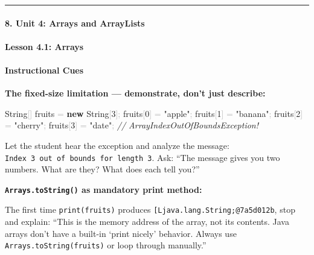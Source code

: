 \documentclass[
  justified,
  openright,
]{tufte-book}
\let\subsection\paragraph
\let\paragraph\paragraph
\newcommand{\KeywordTok}[1]{\textcolor{CodeKeyword}{\textbf{#1}}}  %
\newcommand{\StringTok}[1]{\textcolor{CodeString}{#1}}              %
\newcommand{\CommentTok}[1]{\textcolor{CodeComment}{\textit{#1}}}  %
\newcommand{\CodeNumTok}[1]{\textcolor{CodeNumber}{#1}}             %
\newcommand{\OperatorTok}[1]{\textcolor{DarkGray}{#1}}              %
\newenvironment{Shaded}{%
  \begin{mdframed}[style=TufteCode]%
}{%
  \end{mdframed}%
}
\let\subsection\paragraph
\let\paragraph\paragraph
\begin{document}
\begin{center}\rule{0.5\linewidth}{0.5pt}\end{center}

\subsection{8. Unit 4: Arrays and
ArrayLists}\label{unit-4-arrays-and-arraylists}

\subsection{Lesson 4.1: Arrays}\label{lesson-4.1-arrays-1}

\paragraph{Instructional Cues}\label{instructional-cues-26}

\textbf{The fixed-size limitation --- demonstrate, don't just describe:}

\begin{Shaded}
\begin{Highlighting}[]
String\OperatorTok{[]} fruits \OperatorTok{=} \KeywordTok{new} String\OperatorTok{[}\CodeNumTok{3}\OperatorTok{];}
fruits\OperatorTok{[}\CodeNumTok{0}\OperatorTok{]} \OperatorTok{=} \StringTok{"apple"}\OperatorTok{;}
fruits\OperatorTok{[}\CodeNumTok{1}\OperatorTok{]} \OperatorTok{=} \StringTok{"banana"}\OperatorTok{;}
fruits\OperatorTok{[}\CodeNumTok{2}\OperatorTok{]} \OperatorTok{=} \StringTok{"cherry"}\OperatorTok{;}
fruits\OperatorTok{[}\CodeNumTok{3}\OperatorTok{]} \OperatorTok{=} \StringTok{"date"}\OperatorTok{;}   \CommentTok{// ArrayIndexOutOfBoundsException!}
\end{Highlighting}
\end{Shaded}

Let the student hear the exception and analyze the message:
\texttt{Index\ 3\ out\ of\ bounds\ for\ length\ 3}. Ask: ``The message
gives you two numbers. What are they? What does each tell you?''

\textbf{\texttt{Arrays.toString()} as mandatory print method:}

The first time \texttt{print(fruits)} produces
\texttt{{[}Ljava.lang.String;@7a5d012b}, stop and explain: ``This is the
memory address of the array, not its contents. Java arrays don't have a
built-in `print nicely' behavior. Always use
\texttt{Arrays.toString(fruits)} or loop through manually.''
\end{document}
